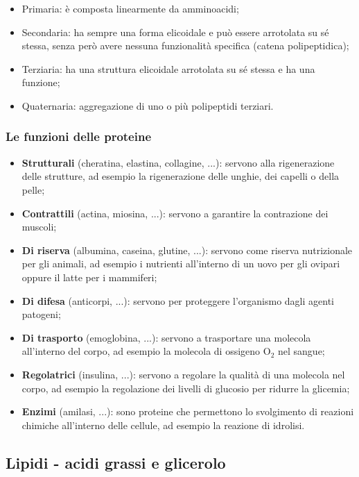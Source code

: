 \documentclass{article}
\begin{document}
\begin{itemize}
    \item Primaria: è composta linearmente da amminoacidi;
    \item Secondaria: ha sempre una forma elicoidale e può essere arrotolata su sé stessa,
        senza però avere nessuna funzionalità specifica (catena polipeptidica);  
    \item Terziaria: ha una struttura elicoidale arrotolata su sé stessa e ha una funzione;
    \item Quaternaria: aggregazione di uno o più polipeptidi terziari.
\end{itemize}

\subsubsection{Le funzioni delle proteine}
\begin{itemize}
    \item \textbf{Strutturali} (cheratina, elastina, collagine, ...): servono alla rigenerazione
        delle strutture, ad esempio la rigenerazione delle unghie, dei capelli o della pelle;
    \item \textbf{Contrattili} (actina, miosina, ...): servono a garantire la contrazione dei
        muscoli;
    \item \textbf{Di riserva} (albumina, caseina, glutine, ...): servono come riserva
        nutrizionale per gli animali, ad esempio i nutrienti all'interno di un uovo per gli
        ovipari oppure il latte per i mammiferi;
    \item \textbf{Di difesa} (anticorpi, ...): servono per proteggere l'organismo dagli agenti
        patogeni;
    \item \textbf{Di trasporto} (emoglobina, ...): servono a trasportare una molecola
        all'interno del corpo, ad esempio la molecola di ossigeno O$_2$ nel sangue;
    \item \textbf{Regolatrici} (insulina, ...): servono a regolare la qualità di una molecola
        nel corpo, ad esempio la regolazione dei livelli di glucosio per ridurre la glicemia;
    \item \textbf{Enzimi} (amilasi, ...): sono proteine che permettono lo svolgimento di
        reazioni chimiche all'interno delle cellule, ad esempio la reazione di idrolisi.
\end{itemize}

\newpage
\subsection{Lipidi - acidi grassi e glicerolo}
\end{document}
